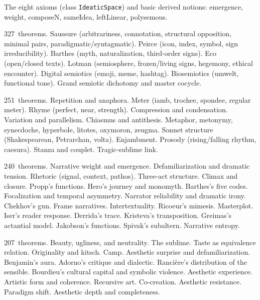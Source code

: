 \documentclass[11pt,oneside]{book}
\theoremstyle{plain}
\theoremstyle{definition}
\theoremstyle{remark}
\begin{document}
\begin{description}[leftmargin=3em]
\item[\texttt{IDT\_v3\_Foundations.lean}] The eight axioms (class
  \texttt{IdeaticSpace}) and basic derived notions: emergence, weight,
  composeN, sameIdea, leftLinear, polysemous.

\item[\texttt{IDT\_v3\_Semiotics.lean}] 327~theorems. Saussure (arbitrariness,
  connotation, structural opposition, minimal pairs, paradigmatic/syntagmatic).
  Peirce (icon, index, symbol, sign irreducibility). Barthes (myth, naturalization,
  third-order signs). Eco (open/closed texts). Lotman (semiosphere, frozen/living
  signs, hegemony, ethical encounter). Digital semiotics (emoji, meme, hashtag).
  Biosemiotics (umwelt, functional tone). Grand semiotic dichotomy and master
  cocycle.

\item[\texttt{IDT\_v3\_Poetics.lean}] 251~theorems. Repetition and anaphora.
  Meter (iamb, trochee, spondee, regular meter). Rhyme (perfect, near, strength).
  Compression and condensation. Variation and parallelism. Chiasmus and
  antithesis. Metaphor, metonymy, synecdoche, hyperbole, litotes, oxymoron,
  zeugma. Sonnet structure (Shakespearean, Petrarchan, volta). Enjambment.
  Prosody (rising/falling rhythm, caesura). Stanza and couplet. Tragic-sublime
  link.

\item[\texttt{IDT\_v3\_Narrative.lean}] 240~theorems. Narrative weight and
  emergence. Defamiliarization and dramatic tension. Rhetoric (signal, context,
  pathos). Three-act structure. Climax and closure. Propp's functions. Hero's
  journey and monomyth. Barthes's five codes. Focalization and temporal
  asymmetry. Narrator reliability and dramatic irony. Chekhov's gun. Frame
  narratives. Intertextuality. Ricoeur's mimesis. Masterplot. Iser's reader
  response. Derrida's trace. Kristeva's transposition. Greimas's actantial model.
  Jakobson's functions. Spivak's subaltern. Narrative entropy.

\item[\texttt{IDT\_v3\_Aesthetics.lean}] 207~theorems. Beauty, ugliness, and
  neutrality. The sublime. Taste as equivalence relation. Originality and kitsch.
  Camp. Aesthetic surprise and defamiliarization. Benjamin's aura. Adorno's
  critique and dialectic. Rancière's distribution of the sensible. Bourdieu's
  cultural capital and symbolic violence. Aesthetic experience. Artistic form and
  coherence. Recursive art. Co-creation. Aesthetic resistance. Paradigm shift.
  Aesthetic depth and completeness.
\end{description}
\end{document}
